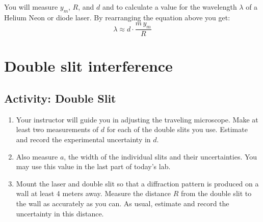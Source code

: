 You will measure $y_{m}$, $R$, and $d$ and  to calculate a value for the wavelength $\lambda$ of a Helium Neon or diode laser. By rearranging the equation above you get:
\begin{equation} \label{e:lambda}
	\lambda \approx d \cdot \frac{m\, y_{m}}{R}
\end{equation}

\section {Double slit interference}

\subsection{Activity: Double Slit}
\begin{enumerate}
	\item Your instructor will guide you in adjusting the traveling microscope.  Make at least two measurements of $d$ for each of the double slits you use.  Estimate and record the experimental uncertainty in $d$.
	\item Also measure $a$, the width of the individual slits and their uncertainties.  You may use this value in the last part of today's lab.
	\item Mount the laser and double slit so that a diffraction pattern is produced on a wall at least 4 meters away.  Measure the distance $R$ from the double slit to the wall as accurately as you can.  As usual, estimate and record the uncertainty in this distance.
\end{enumerate}

